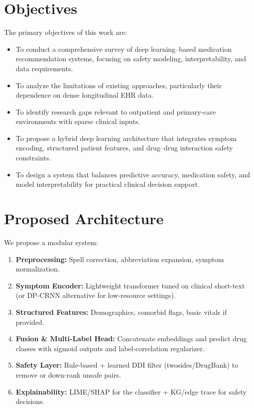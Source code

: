 \section{Objectives}

The primary objectives of this work are:

\begin{itemize}
\item To conduct a comprehensive survey of deep learning–based medication recommendation systems, focusing on safety modeling, interpretability, and data requirements.
\item To analyze the limitations of existing approaches, particularly their dependence on dense longitudinal EHR data.
\item To identify research gaps relevant to outpatient and primary-care environments with sparse clinical inputs.
\item To propose a hybrid deep learning architecture that integrates symptom encoding, structured patient features, and drug–drug interaction safety constraints.
\item To design a system that balances predictive accuracy, medication safety, and model interpretability for practical clinical decision support.
\end{itemize}


\section{Proposed Architecture}
We propose a modular system:
\begin{enumerate}
\item \textbf{Preprocessing:} Spell correction, abbreviation expansion, symptom normalization.
\item \textbf{Symptom Encoder:} Lightweight transformer tuned on clinical short-text (or DP-CRNN alternative for low-resource settings).
\item \textbf{Structured Features:} Demographics, comorbid flags, basic vitals if provided.
\item \textbf{Fusion \& Multi-Label Head:} Concatenate embeddings and predict drug classes with sigmoid outputs and label-correlation regularizer.
\item \textbf{Safety Layer:} Rule-based + learned DDI filter (twosides/DrugBank) to remove or down-rank unsafe pairs.
\item \textbf{Explainability:} LIME/SHAP for the classifier + KG/edge trace for safety decisions.
\end{enumerate}
